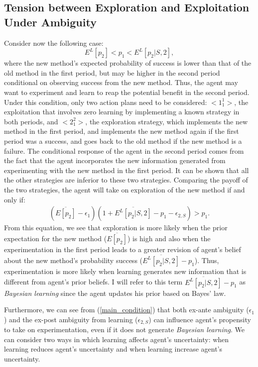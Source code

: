 \documentclass[11pt]{article} %
\theoremstyle{exampstyle}
\newcommand{\eq}[1]{\begin{align}#1\end{align}}
\begin{document}
\subsection{Tension between Exploration and Exploitation Under Ambiguity}

Consider now the following case:
%
\[ E^L[p_2] < p_1 < E^L[p_2 |S,2], \]
%
where the new method's expected probability of success is lower than that of the old method in the first period, but may be higher in the second period conditional on observing success from the new method. Thus, the agent may want to experiment and learn to reap the potential benefit in the second period. Under this condition, only two action plans need to be considered: $<\! 1_1^1 \!>$, the exploitation that involves zero learning by implementing a known strategy in both periods, and $<\! 2^2_1 \!>$, the exploration strategy, which implements the new method in the first period, and implements the new method again if the first period was a success, and goes back to the old method if the new method is a failure. The conditional response of the agent in the second period comes from the fact that the agent incorporates the new information generated from experimenting with the new method in the first period. It can be shown that all the other strategies are inferior to these two strategies.                                                                                                                                                                                           
Comparing the payoff of the two strategies, the agent will take on exploration of the new method if and only if:
%
\eq{
\label{main_condition}
 (\overline{E[p_2]} - \epsilon_1) (1+\overline{E^L[p_2|S,2]} - p_1  - \epsilon_{2,S})  > p_1.
}
%
From this equation, we see that exploration is more likely when the prior expectation for the new method ($\overline{E[p_2]}$) is high and also when the experimentation in the first period leads to a greater revision of agent's belief about the new method's probability success ($\overline{E^L[p_2|S,2]} - p_1$). Thus, experimentation is more likely when learning generates new information that is different from agent's prior beliefs. I will refer to this term $\overline{E^L[p_2|S,2]} - p_1$ as \emph{Bayesian learning} since the agent updates his prior based on Bayes' law. 

Furthermore, we can see from (\ref{main_condition}) that both ex-ante ambiguity ($\epsilon_1$) and the ex-post ambiguity from learning ($\epsilon_{2,S}$) can influence agent's propensity to take on experimentation, even if it does not generate \emph{Bayesian learning}. We can consider two ways in which learning affects agent's uncertainty: when learning reduces agent's uncertainty and when learning increase agent's uncertainty. 
\end{document}
